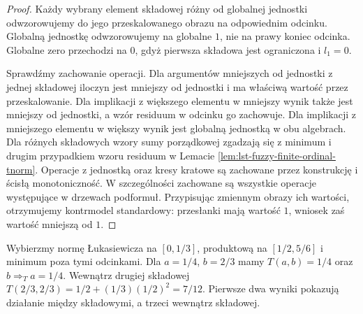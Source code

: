 \begin{proof}
Każdy wybrany element składowej różny od
globalnej jednostki odwzorowujemy do jego
przeskalowanego obrazu na odpowiednim odcinku.
Globalną jednostkę odwzorowujemy na globalne $1$,
nie na prawy koniec odcinka. Globalne zero przechodzi
na $0$, gdyż pierwsza składowa jest ograniczona
i $l_1=0$.

Sprawdźmy zachowanie operacji. Dla argumentów
mniejszych od jednostki z jednej składowej
iloczyn jest mniejszy od jednostki i ma
właściwą wartość przez przeskalowanie.
Dla implikacji z większego elementu w mniejszy
wynik także jest mniejszy od jednostki,
a wzór residuum w odcinku go zachowuje.
Dla implikacji z mniejszego elementu w większy
wynik jest globalną jednostką w obu algebrach.
Dla różnych składowych wzory sumy porządkowej
zgadzają się z minimum i drugim przypadkiem
wzoru residuum w Lemacie
\ref{lem:lst-fuzzy-finite-ordinal-tnorm}.
Operacje z jednostką oraz kresy kratowe są
zachowane przez konstrukcję i ścisłą monotoniczność.
W szczególności zachowane są wszystkie operacje
występujące w drzewach podformuł.
Przypisując zmiennym obrazy ich wartości,
otrzymujemy kontrmodel standardowy: przesłanki
mają wartość $1$, wniosek zaś wartość mniejszą
od $1$.
\end{proof}

\begin{przyklad}
\label{ex:lst-fuzzy-ordinal-tnorm}
Wybierzmy normę Łukasiewicza na $[0,1/3]$,
produktową na $[1/2,5/6]$ i minimum poza tymi
odcinkami. Dla $a=1/4$, $b=2/3$ mamy
$T(a,b)=1/4$ oraz $b\Rightarrow_T a=1/4$.
Wewnątrz drugiej składowej
$T(2/3,2/3)=1/2+(1/3)(1/2)^2=7/12$.
Pierwsze dwa wyniki pokazują działanie
między składowymi, a trzeci wewnątrz składowej.
\begin{center}
\end{center}
\end{przyklad}

